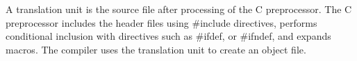 A translation unit is the source file after processing of the C preprocessor. The C preprocessor includes the header files using \#include directives, performs conditional inclusion with directives such as \#ifdef, or \#ifndef, and expands macros. The compiler uses the translation unit to create an object file.